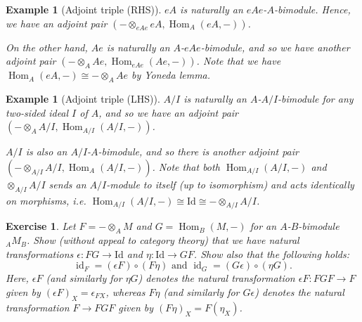 \documentclass[11pt,a4paper]{article}
\numberwithin{equation}{section}
\theoremstyle{all}
\newtheorem{example}[theorem]{Example}
\newtheorem{exercise}[theorem]{Exercise}
\theoremstyle{remark}
\newcommand{\id}{\operatorname{id}}
\newcommand{\Hom}{\operatorname{Hom}\nolimits}
\begin{document}
\begin{example}[Adjoint triple (RHS)]
$eA$ is naturally an $eAe$-$A$-bimodule.
Hence, we have an adjoint pair $(-\otimes_{eAe}eA, \Hom_{A}(eA,-))$.

On the other hand, $Ae$ is naturally an $A$-$eAe$-bimodule, and so we have another adjoint pair $(-\otimes_A Ae, \Hom_{eAe}(Ae,-))$.
Note that we have $\Hom_{A}(eA,-)\cong -\otimes_AAe$ by Yoneda lemma.
\end{example}

\begin{example}[Adjoint triple (LHS)]
$A/I$ is naturally an $A$-$A/I$-bimodule for any two-sided ideal $I$ of $A$, and so we have an adjoint pair $(-\otimes_A A/I, \Hom_{A/I}(A/I,-))$.

$A/I$ is also an $A/I$-$A$-bimodule, and so there is another adjoint pair $(-\otimes_{A/I}A/I, \Hom_A(A/I,-))$.
Note that both $\Hom_{A/I}(A/I,-)$ and $\otimes_{A/I}A/I$ sends an $A/I$-module to itself (up to isomorphism) and acts identically on morphisms, i.e. $\Hom_{A/I}(A/I,-)\cong \mathrm{Id} \cong -\otimes_{A/I}A/I$.
\end{example}

\begin{exercise}
Let $F=-\otimes_A M$ and $G=\Hom_B(M,-)$ for an $A$-$B$-bimodule ${}_AM_B$.  Show (without appeal to category theory) that we have natural transformations $\epsilon: FG\to \mathrm{Id}$ and $\eta:\mathrm{Id}\to GF$.  Show also that the following holds:
\[
\id_F = (\epsilon F) \circ (F\eta) \text{ and } \id_G = (G\epsilon)\circ (\eta G).
\]
Here, $\epsilon F$ (and similarly for $\eta G$) denotes the natural transformation $\epsilon F: FGF \to F$ given by $(\epsilon F)_X = \epsilon_{FX}$, whereas $F\eta$ (and similarly for $G\epsilon$) denotes the natural transformation $F\to FGF$ given by $(F\eta)_X = F(\eta_X)$.
\end{exercise}
\end{document}
